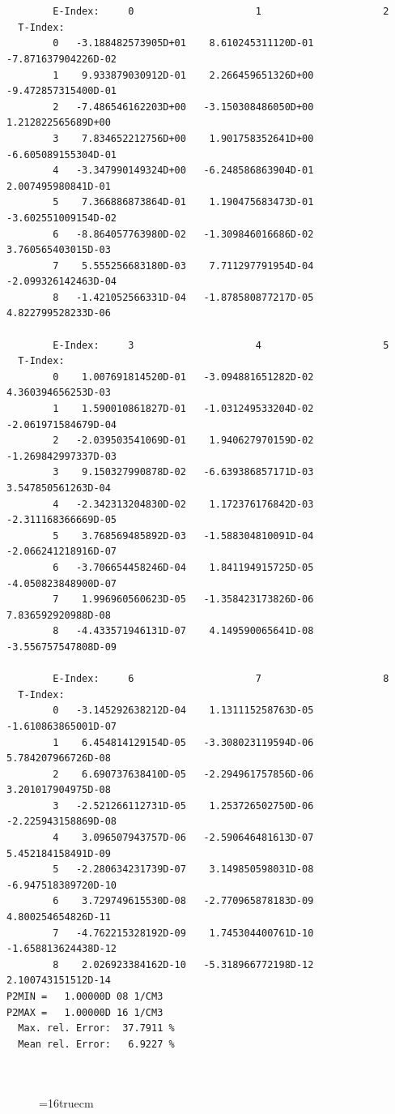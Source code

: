 \documentclass[12pt,dvipdfmx]{article}
\begin{document}
\begin{small}\begin{verbatim}


        E-Index:     0                     1                     2
  T-Index:
        0   -3.188482573905D+01    8.610245311120D-01   -7.871637904226D-02
        1    9.933879030912D-01    2.266459651326D+00   -9.472857315400D-01
        2   -7.486546162203D+00   -3.150308486050D+00    1.212822565689D+00
        3    7.834652212756D+00    1.901758352641D+00   -6.605089155304D-01
        4   -3.347990149324D+00   -6.248586863904D-01    2.007495980841D-01
        5    7.366886873864D-01    1.190475683473D-01   -3.602551009154D-02
        6   -8.864057763980D-02   -1.309846016686D-02    3.760565403015D-03
        7    5.555256683180D-03    7.711297791954D-04   -2.099326142463D-04
        8   -1.421052566331D-04   -1.878580877217D-05    4.822799528233D-06

        E-Index:     3                     4                     5
  T-Index:
        0    1.007691814520D-01   -3.094881651282D-02    4.360394656253D-03
        1    1.590010861827D-01   -1.031249533204D-02   -2.061971584679D-04
        2   -2.039503541069D-01    1.940627970159D-02   -1.269842997337D-03
        3    9.150327990878D-02   -6.639386857171D-03    3.547850561263D-04
        4   -2.342313204830D-02    1.172376176842D-03   -2.311168366669D-05
        5    3.768569485892D-03   -1.588304810091D-04   -2.066241218916D-07
        6   -3.706654458246D-04    1.841194915725D-05   -4.050823848900D-07
        7    1.996960560623D-05   -1.358423173826D-06    7.836592920988D-08
        8   -4.433571946131D-07    4.149590065641D-08   -3.556757547808D-09

        E-Index:     6                     7                     8
  T-Index:
        0   -3.145292638212D-04    1.131115258763D-05   -1.610863865001D-07
        1    6.454814129154D-05   -3.308023119594D-06    5.784207966726D-08
        2    6.690737638410D-05   -2.294961757856D-06    3.201017904975D-08
        3   -2.521266112731D-05    1.253726502750D-06   -2.225943158869D-08
        4    3.096507943757D-06   -2.590646481613D-07    5.452184158491D-09
        5   -2.280634231739D-07    3.149850598031D-08   -6.947518389720D-10
        6    3.729749615530D-08   -2.770965878183D-09    4.800254654826D-11
        7   -4.762215328192D-09    1.745304400761D-10   -1.658813624438D-12
        8    2.026923384162D-10   -5.318966772198D-12    2.100743151512D-14
P2MIN =   1.00000D 08 1/CM3
P2MAX =   1.00000D 16 1/CM3
  Max. rel. Error:  37.7911 %
  Mean rel. Error:   6.9227 %



\end{verbatim}\end{small}
\begin{figure} \label{2.3.2e}
\epsfxsize=16truecm
\end{figure}
\newpage
\end{document}
